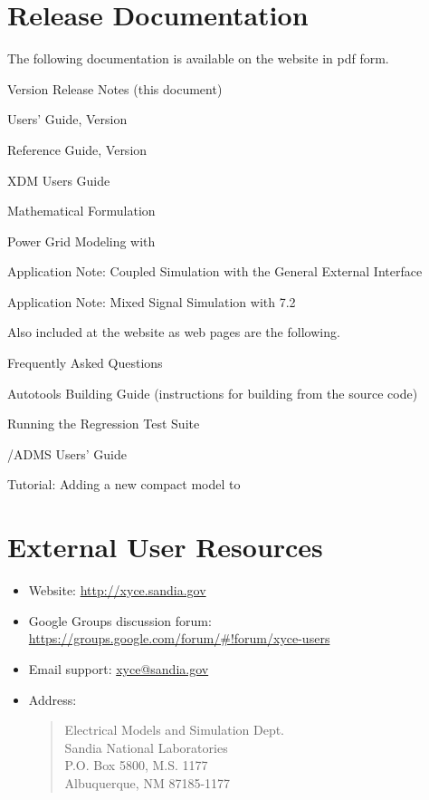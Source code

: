 \documentclass[letterpaper]{scrartcl}
\begin{document}
\section{\Xyce{} Release \XyceVersionVar{} Documentation}
The following \Xyce{} documentation is available on the \Xyce{} website in pdf
form.
\begin{XyceItemize}
  \item \Xyce{} Version \XyceVersionVar{} Release Notes (this document)
  \item \Xyce{} Users' Guide, Version \XyceVersionVar{}
  \item \Xyce{} Reference Guide, Version \XyceVersionVar{}
  \item XDM Users Guide
  \item \Xyce{} Mathematical Formulation
  \item Power Grid Modeling with \Xyce{}
  \item Application Note: Coupled Simulation with the \Xyce{} General
    External Interface
  \item Application Note: Mixed Signal Simulation with \Xyce{} 7.2
\end{XyceItemize}
Also included at the \Xyce{} website as web pages are the following.
\begin{XyceItemize}
  \item Frequently Asked Questions
  \item Autotools Building Guide (instructions for building \Xyce{} from the
       source code)
  \item Running the \Xyce{} Regression Test Suite
  \item \Xyce{}/ADMS Users' Guide
  \item Tutorial:  Adding a new compact model to \Xyce{}
\end{XyceItemize}


\section{External User Resources}
\begin{itemize}
  \item Website: {\color{XyceDeepRed}\url{http://xyce.sandia.gov}}
  \item Google Groups discussion forum:
    {\color{XyceDeepRed}\url{https://groups.google.com/forum/#!forum/xyce-users}}
  \item Email support:
    {\color{XyceDeepRed}\href{mailto:xyce@sandia.gov}{xyce@sandia.gov}}
  \item Address:
    \begin{quote}
            Electrical Models and Simulation Dept.\\
            Sandia National Laboratories\\
            P.O. Box 5800, M.S. 1177\\
            Albuquerque, NM 87185-1177 \\
    \end{quote}
\end{itemize}
\end{document}
